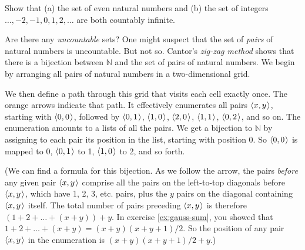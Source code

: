 \begin{exercise}
  Show that (a) the set of even natural numbers and (b) the set of integers $\ldots, -2, -1, 0, 1, 2, \ldots$ are both countably infinite.
\end{exercise}



Are there any \emph{uncountable} sets?
One might suspect that the set of \emph{pairs} of natural numbers is uncountable.
But not so.
Cantor's \emph{zig-zag method} shows that
there is a bijection between $\mathbb{N}$ and the set of pairs of natural numbers.
We begin by arranging all pairs of natural numbers in a two-dimensional grid.
%
\begin{center}
  
\end{center}
%
We then define a path through this grid that visits each cell exactly once.
The orange arrows indicate that path.
It effectively enumerates all pairs $\t{x, y}$,
starting with $\t{0,0}$,
followed by $\t{0,1}$, $\t{1,0}$, $\t{2,0}$, $\t{1,1}$, $\t{0,2}$, and so on.
The enumeration amounts to a lists of all the pairs.
We get a bijection to $\mathbb{N}$ by assigning to each pair
its position in the list, starting with position 0.
So $\t{0,0}$ is mapped to 0,
$\t{0,1}$ to 1,
$\t{1,0}$ to 2,
and so forth.

(We can find a formula for this bijection.
As we follow the arrow,
the pairs \emph{before} any given pair $\t{x,y}$ comprise
all the pairs on the left-to-top diagonals before $\t{x,y}$,
which have 1, 2, 3, etc. pairs,
plus the $y$ pairs on the diagonal containing $\t{x,y}$ itself.
The total number of pairs preceding $\t{x,y}$ is therefore
$(1 + 2 + \ldots + (x+y)) + y$.
In exercise \ref{ex:gauss-sum},
you showed that $1+2+ \ldots + (x+y) = (x + y)(x + y + 1)/2$.
So the position of any pair $\t{x,y}$ in the enumeration is
$(x+y)(x+y+1)/2 + y$.)


